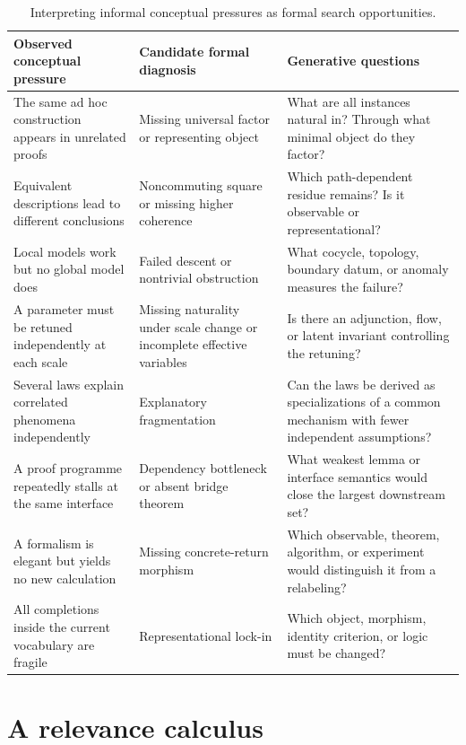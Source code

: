 \documentclass[11pt]{article}
\begin{document}
\begin{table}[ht]
\centering
\small
\begin{tabularx}{\textwidth}{>{\raggedright\arraybackslash}p{}
>{\raggedright\arraybackslash}p{}X}
\toprule
Observed conceptual pressure & Candidate formal diagnosis & Generative questions \\
\midrule
The same ad hoc construction appears in unrelated proofs & Missing universal factor or representing object & What are all instances natural in? Through what minimal object do they factor? \\
Equivalent descriptions lead to different conclusions & Noncommuting square or missing higher coherence & Which path-dependent residue remains? Is it observable or representational? \\
Local models work but no global model does & Failed descent or nontrivial obstruction & What cocycle, topology, boundary datum, or anomaly measures the failure? \\
A parameter must be retuned independently at each scale & Missing naturality under scale change or incomplete effective variables & Is there an adjunction, flow, or latent invariant controlling the retuning? \\
Several laws explain correlated phenomena independently & Explanatory fragmentation & Can the laws be derived as specializations of a common mechanism with fewer independent assumptions? \\
A proof programme repeatedly stalls at the same interface & Dependency bottleneck or absent bridge theorem & What weakest lemma or interface semantics would close the largest downstream set? \\
A formalism is elegant but yields no new calculation & Missing concrete-return morphism & Which observable, theorem, algorithm, or experiment would distinguish it from a relabeling? \\
All completions inside the current vocabulary are fragile & Representational lock-in & Which object, morphism, identity criterion, or logic must be changed? \\
\bottomrule
\end{tabularx}
\caption{Interpreting informal conceptual pressures as formal search opportunities.}
\label{tab:pressure}
\end{table}

\section{A relevance calculus}
\end{document}
